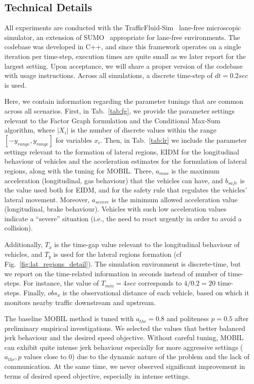 \subsection{Technical Details}\label{subsec:tech}

All experiments are conducted with the TrafficFluid-Sim~\cite{tsim_sumo2022} lane-free microscopic simulator, an extension of SUMO~\cite{sumopaper} appropriate for lane-free environments.
The codebase was developed in C++, and since this framework operates on a single iteration per time-step, execution times are quite small as we later report for the largest setting.
Upon acceptance, we will share a proper version of the codebase with usage instructions.
Across all simulations, a discrete time-step of $dt=0.2sec$ is used.

Here, we contain information regarding the parameter tunings that are common across all scenarios.
First, in Tab.~\ref{tab:fg}, we provide the parameter settings relevant to the Factor Graph formulation and the Conditional Max-Sum algorithm, where $|X_i|$ is the number of discrete values within the range $[-y_{range},y_{range}]$ for variables $x_i$.
Then, in Tab.~\ref{tab:lr} we include the parameter settings relevant to the formation of lateral regions, EIDM for the longitudinal behaviour of vehicles and the acceleration estimates for the formulation of lateral regions, along with the tuning for MOBIL.
There, $a_{max}$ is the maximum acceleration (longitudinal, gas behaviour)  that the vehicles can have, and $b_{safe}$ is the value used both for EIDM, and for the safety rule that regulates the vehicles' lateral movement.
Moreover, $a_{severe}$ is the minimum allowed acceleration value (longitudinal, brake behaviour).
Vehicles with such low acceleration values indicate a ``severe'' situation (i.e., the need to react urgently in order to avoid a collision).

Additionally, $T_x$ is the time-gap value relevant to the longitudinal behaviour of vehicles, and $T_y$ is used for the lateral regions formation (cf Fig.~\ref{fig:lat_regions_detail}).
The simulation environment is discrete-time, but we report on the time-related information in seconds instead of number of time-steps.
For instance, the value of $T_{min}=4sec$ corresponds to $4/0.2=20$ time-steps.
Finally, ${obs}_x$ is the observational distance of each vehicle, based on which it monitors nearby traffic downstream and upstream.



The baseline MOBIL method is tuned with $a_{thr}=0.8$ and politeness $p=0.5$ after preliminary empirical investigations. We selected the values that better balanced jerk behaviour and the desired speed objective.
Without careful tuning, MOBIL can exhibit quite intense jerk behaviour especially for more aggressive settings ($a_{thr},p$ values close to $0$) due to the dynamic nature of the problem and the lack of communication.
At the same time, we never observed significant improvement in terms of desired speed objective, especially in intense settings.








